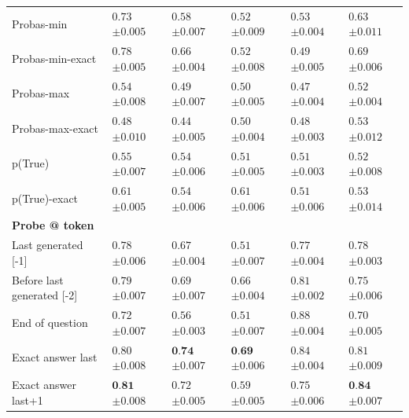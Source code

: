 \begin{table}[t]
{\begin{tabular}{l|lllll}
Probas-min & $0.73$ \tiny$\pm 0.005$ & $0.58$ \tiny$\pm 0.007$ & $0.52$ \tiny$\pm 0.009$ & $0.53$ \tiny$\pm 0.004$ & $0.63$ \tiny$\pm 0.011$ \\
Probas-min-exact & $0.78$ \tiny$\pm 0.005$ & $0.66$ \tiny$\pm 0.004$ & $0.52$ \tiny$\pm 0.008$ & $0.49$ \tiny$\pm 0.005$ & $0.69$ \tiny$\pm 0.006$ \\
Probas-max & $0.54$ \tiny$\pm 0.008$ & $0.49$ \tiny$\pm 0.007$ & $0.50$ \tiny$\pm 0.005$ & $0.47$ \tiny$\pm 0.004$ & $0.52$ \tiny$\pm 0.004$ \\
Probas-max-exact & $0.48$ \tiny$\pm 0.010$ & $0.44$ \tiny$\pm 0.005$ & $0.50$ \tiny$\pm 0.004$ & $0.48$ \tiny$\pm 0.003$ & $0.53$ \tiny$\pm 0.012$ \\
p(True) & $0.55$ \tiny$\pm 0.007$ & $0.54$ \tiny$\pm 0.006$ & $0.51$ \tiny$\pm 0.005$ & $0.51$ \tiny$\pm 0.003$ & $0.52$ \tiny$\pm 0.008$ \\
p(True)-exact & $0.61$ \tiny$\pm 0.005$ & $0.54$ \tiny$\pm 0.006$ & $0.61$ \tiny$\pm 0.006$ & $0.51$ \tiny$\pm 0.006$ & $0.53$ \tiny$\pm 0.014$ \\
\midrule
\textbf{Probe @ token} \\
\midrule

Last generated [-1] & $0.78$ \tiny$\pm 0.006$ & $0.67$ \tiny$\pm 0.004$ & $0.51$ \tiny$\pm 0.007$ & $0.77$ \tiny$\pm 0.004$ & $0.78$ \tiny$\pm 0.003$ \\
Before last generated [-2] & $0.79$ \tiny$\pm 0.007$ & $0.69$ \tiny$\pm 0.007$ & $0.66$ \tiny$\pm 0.004$ & $0.81$ \tiny$\pm 0.002$ & $0.75$ \tiny$\pm 0.006$ \\
End of question & $0.72$ \tiny$\pm 0.007$ & $0.56$ \tiny$\pm 0.003$ & $0.51$ \tiny$\pm 0.007$ & $0.88$ \tiny$\pm 0.004$ & $0.70$ \tiny$\pm 0.005$ \\
\midrule
Exact answer last & $0.80$ \tiny$\pm 0.008$ & $\textbf{0.74}$ \tiny$\pm 0.007$ & $\textbf{0.69}$ \tiny$\pm 0.006$ & $0.84$ \tiny$\pm 0.004$ & $0.81$ \tiny$\pm 0.009$ \\
Exact answer last+1 & $\textbf{0.81}$ \tiny$\pm 0.008$ & $0.72$ \tiny$\pm 0.005$ & $0.59$ \tiny$\pm 0.005$ & $0.75$ \tiny$\pm 0.006$ & $\textbf{0.84}$ \tiny$\pm 0.007$ \\
     \bottomrule
    \end{tabular}
    }
    \label{tab:mistral_regular_error_detection}
\end{table}
